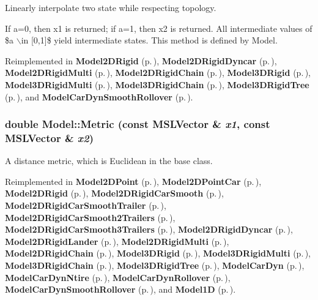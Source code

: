 Linearly interpolate two state while respecting topology.

If a=0, then x1 is returned; if a=1, then x2 is returned. All intermediate values of \$a $\backslash$in [0,1]\$ yield intermediate states. This method is defined by Model. 

Reimplemented in {\bf Model2DRigid} {\rm (p.\,\pageref{classModel2DRigid_a4})}, {\bf Model2DRigid\-Dyncar} {\rm (p.\,\pageref{classModel2DRigidDyncar_a6})}, {\bf Model2DRigid\-Multi} {\rm (p.\,\pageref{classModel2DRigidMulti_a4})}, {\bf Model2DRigid\-Chain} {\rm (p.\,\pageref{classModel2DRigidChain_a4})}, {\bf Model3DRigid} {\rm (p.\,\pageref{classModel3DRigid_a5})}, {\bf Model3DRigid\-Multi} {\rm (p.\,\pageref{classModel3DRigidMulti_a3})}, {\bf Model3DRigid\-Chain} {\rm (p.\,\pageref{classModel3DRigidChain_a4})}, {\bf Model3DRigid\-Tree} {\rm (p.\,\pageref{classModel3DRigidTree_a4})}, and {\bf Model\-Car\-Dyn\-Smooth\-Rollover} {\rm (p.\,\pageref{classModelCarDynSmoothRollover_a5})}.
\subsubsection{\setlength{\rightskip}{0pt plus 5cm}double Model::Metric (const {\bf MSLVector} \& {\em x1}, const {\bf MSLVector} \& {\em x2})\hspace{0.3cm}{\tt  [virtual]}}\label{classModel_a9}


A distance metric, which is Euclidean in the base class.



Reimplemented in {\bf Model2DPoint} {\rm (p.\,\pageref{classModel2DPoint_a4})}, {\bf Model2DPoint\-Car} {\rm (p.\,\pageref{classModel2DPointCar_a4})}, {\bf Model2DRigid} {\rm (p.\,\pageref{classModel2DRigid_a5})}, {\bf Model2DRigid\-Car\-Smooth} {\rm (p.\,\pageref{classModel2DRigidCarSmooth_a4})}, {\bf Model2DRigid\-Car\-Smooth\-Trailer} {\rm (p.\,\pageref{classModel2DRigidCarSmoothTrailer_a3})}, {\bf Model2DRigid\-Car\-Smooth2Trailers} {\rm (p.\,\pageref{classModel2DRigidCarSmooth2Trailers_a3})}, {\bf Model2DRigid\-Car\-Smooth3Trailers} {\rm (p.\,\pageref{classModel2DRigidCarSmooth3Trailers_a3})}, {\bf Model2DRigid\-Dyncar} {\rm (p.\,\pageref{classModel2DRigidDyncar_a5})}, {\bf Model2DRigid\-Lander} {\rm (p.\,\pageref{classModel2DRigidLander_a5})}, {\bf Model2DRigid\-Multi} {\rm (p.\,\pageref{classModel2DRigidMulti_a2})}, {\bf Model2DRigid\-Chain} {\rm (p.\,\pageref{classModel2DRigidChain_a5})}, {\bf Model3DRigid} {\rm (p.\,\pageref{classModel3DRigid_a4})}, {\bf Model3DRigid\-Multi} {\rm (p.\,\pageref{classModel3DRigidMulti_a2})}, {\bf Model3DRigid\-Chain} {\rm (p.\,\pageref{classModel3DRigidChain_a5})}, {\bf Model3DRigid\-Tree} {\rm (p.\,\pageref{classModel3DRigidTree_a5})}, {\bf Model\-Car\-Dyn} {\rm (p.\,\pageref{classModelCarDyn_a3})}, {\bf Model\-Car\-Dyn\-Ntire} {\rm (p.\,\pageref{classModelCarDynNtire_a3})}, {\bf Model\-Car\-Dyn\-Rollover} {\rm (p.\,\pageref{classModelCarDynRollover_a6})}, {\bf Model\-Car\-Dyn\-Smooth\-Rollover} {\rm (p.\,\pageref{classModelCarDynSmoothRollover_a4})}, and {\bf Model1D} {\rm (p.\,\pageref{classModel1D_a5})}.
